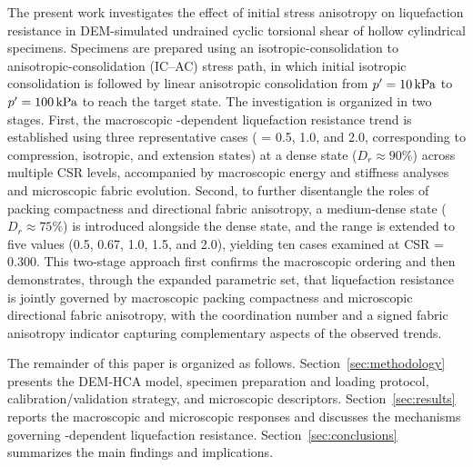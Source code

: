 The present work investigates the effect of initial stress anisotropy on liquefaction resistance in DEM-simulated undrained cyclic torsional shear of hollow cylindrical specimens. Specimens are prepared using an isotropic-consolidation to anisotropic-consolidation (IC--AC) stress path, in which initial isotropic consolidation is followed by linear anisotropic consolidation from $p^\prime=\SI{10}{kPa}$ to $p^\prime=\SI{100}{kPa}$ to reach the target \Kzero{} state. The investigation is organized in two stages. First, the macroscopic \Kzero{}-dependent liquefaction resistance trend is established using three representative cases (\Kzero{} = 0.5, 1.0, and 2.0, corresponding to compression, isotropic, and extension states) at a dense state ($D_r \approx 90\%$) across multiple CSR levels, accompanied by macroscopic energy and stiffness analyses and microscopic fabric evolution. Second, to further disentangle the roles of packing compactness and directional fabric anisotropy, a medium-dense state ($D_r \approx 75\%$) is introduced alongside the dense state, and the \Kzero{} range is extended to five values (0.5, 0.67, 1.0, 1.5, and 2.0), yielding ten cases examined at CSR = 0.300. This two-stage approach first confirms the macroscopic \Kzero{} ordering and then demonstrates, through the expanded parametric set, that liquefaction resistance is jointly governed by macroscopic packing compactness and microscopic directional fabric anisotropy, with the coordination number and a signed fabric anisotropy indicator capturing complementary aspects of the observed trends.

The remainder of this paper is organized as follows. Section~\ref{sec:methodology} presents the DEM-HCA model, specimen preparation and loading protocol, calibration/validation strategy, and microscopic descriptors. Section~\ref{sec:results} reports the macroscopic and microscopic responses and discusses the mechanisms governing \Kzero{}-dependent liquefaction resistance. Section~\ref{sec:conclusions} summarizes the main findings and implications.
